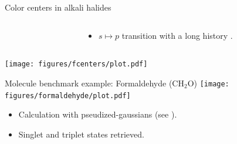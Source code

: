 \documentclass[final]{beamer}
\begin{document}
\begin{frame}[fragile]{}
\begin{columns}[t]
\begin{column}{.49\linewidth}
\begin{block}{\large Color centers in alkali halides}
\begin{center}
        \begin{columns}
          \begin{column}{0.7\textwidth}
          \end{column}
          \begin{column}{0.3\textwidth}
            \begin{itemize}
              \item
                $ s \mapsto p $ transition with a long history
                \cite{pohl1925}.
            \end{itemize}
          \end{column}
        \end{columns}
        \texttt{[image: figures/fcenters/plot.pdf]}

      \end{center}
      \end{block}

      \begin{block}{\large Molecule benchmark example: Formaldehyde (CH$_2$O)}
          \texttt{[image: figures/formaldehyde/plot.pdf]}
          \begin{itemize}
            \item
              Calculation with pseudized-gaussians
                (see \cite{10.10631.4961301}).
            \item
              Singlet and triplet states retrieved.
          \end{itemize}
      \end{block}


\end{column}
\end{columns}
\end{frame}
\end{document}
